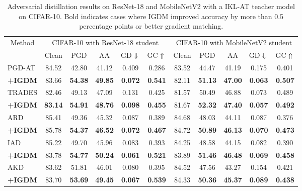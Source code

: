 \documentclass{article} %
\begin{document}
\begin{table}[h]
 \centering
 \caption{Adversarial distillation results on ResNet-18 and MobileNetV2 with a IKL-AT teacher model on CIFAR-10. Bold indicates cases where IGDM improved accuracy by more than 0.5 percentage points or better gradient matching.}
 \setlength{\tabcolsep}{6pt}
 \begin{tabular}{lcccccccccc}
 \toprule
   \multicolumn{1}{c}{\multirow{2.5}{*}{Method}}& \multicolumn{5}{c}{CIFAR-10 with ResNet-18 student}& \multicolumn{5}{c}{CIFAR-10 with MobileNetV2 student} \\
   \cmidrule(r){2-6}
   \cmidrule(r){7-11}
   & Clean & PGD & AA & GD$\Downarrow$ & GC$\Uparrow$ & Clean & PGD & AA & GD$\Downarrow$ & GC$\Uparrow$ \\
\midrule PGD-AT  & 84.52 & 42.80 & 41.12 & 0.409 & 0.286 & 83.52 & 44.47 & 41.19 & 0.175 
& 0.401 
\\
 \textbf{+IGDM} & 83.66 & \textbf{54.38} & \textbf{49.85} & \textbf{0.072} & \textbf{0.541} & 82.11 & \textbf{51.13} & \textbf{47.00} & \textbf{0.063} 
& 
\textbf{0.507}
\\
\midrule TRADES  & 82.46 & 49.13 & 47.09 & 0.131 & 0.425 & 81.57 & 50.49 & 46.88 & 0.073 
& 0.489
\\
 \textbf{+IGDM} &\textbf{83.14} & \textbf{54.91} & \textbf{48.76} &\textbf{0.098} & \textbf{0.455} &81.67 & \textbf{52.32} & \textbf{47.40} & \textbf{0.057} 
& 
\textbf{0.492}
\\
\midrule
 ARD & 85.41 & 49.36 & 45.32 & 0.087 & 0.389 & 84.68 & 48.03 & 44.11 & 0.087 
& 0.376 
\\
 \textbf{+IGDM} & 85.78 & \textbf{54.37} & \textbf{46.52} & \textbf{0.072} & \textbf{0.467} & 84.72 & \textbf{50.89} & \textbf{46.13} & \textbf{0.070} 
& 
\textbf{0.473} 
\\
 \midrule
 IAD & 85.22 & 49.70 & 45.96 & 0.083 & 0.393 & 84.25 & 48.58 & 44.15 & 0.082 
& 0.390 
\\
 \textbf{+IGDM} & 83.78 & \textbf{54.77} & \textbf{50.24} & \textbf{0.061} & \textbf{0.521} & 83.89 & \textbf{51.46} & \textbf{46.48} & \textbf{0.069} 
&
\textbf{0.458} 
\\
 \midrule
 AKD & 83.62& 51.81& 46.01& 0.080& 0.395& 84.52 & 47.56 & 43.27 & 0.154 & 0.421 \\
 \textbf{+IGDM} & 83.70& \textbf{53.69}& \textbf{49.45}& \textbf{0.067}& \textbf{0.539}& 84.33 & \textbf{50.36} & \textbf{45.37} & \textbf{0.089} & \textbf{0.438} 
\\
 \midrule

\end{tabular}
\end{table}
\end{document}

